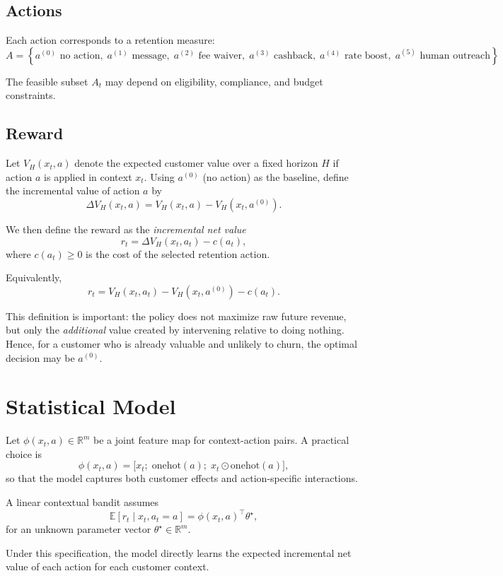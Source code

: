 \documentclass[11pt,a4paper]{article}
\begin{document}
\subsection*{Actions}

Each action corresponds to a retention measure:
\[
A=\left\{
a^{(0)}\text{ no action},\;
a^{(1)}\text{ message},\;
a^{(2)}\text{ fee waiver},\;
a^{(3)}\text{ cashback},\;
a^{(4)}\text{ rate boost},\;
a^{(5)}\text{ human outreach}
\right\}.
\]

The feasible subset \(A_t\) may depend on eligibility, compliance, and budget constraints.

\subsection*{Reward}

Let \(V_H(x_t,a)\) denote the expected customer value over a fixed horizon \(H\) if action \(a\) is applied in context \(x_t\).  
Using \(a^{(0)}\) (no action) as the baseline, define the incremental value of action \(a\) by
\[
\Delta V_H(x_t,a) = V_H(x_t,a) - V_H(x_t,a^{(0)}).
\]

We then define the reward as the \emph{incremental net value}
\[
r_t = \Delta V_H(x_t,a_t) - c(a_t),
\]
where \(c(a_t)\geq 0\) is the cost of the selected retention action.

Equivalently,
\[
r_t = V_H(x_t,a_t) - V_H(x_t,a^{(0)}) - c(a_t).
\]

This definition is important: the policy does not maximize raw future revenue, but only the \emph{additional} value created by intervening relative to doing nothing. Hence, for a customer who is already valuable and unlikely to churn, the optimal decision may be \(a^{(0)}\).

\section{Statistical Model}

Let \(\phi(x_t,a)\in\mathbb{R}^m\) be a joint feature map for context-action pairs. A practical choice is
\[
\phi(x_t,a)=\bigl[x_t;\; \mathrm{onehot}(a);\; x_t \odot \mathrm{onehot}(a)\bigr],
\]
so that the model captures both customer effects and action-specific interactions.

A linear contextual bandit assumes
\[
\mathbb{E}[r_t \mid x_t, a_t=a] = \phi(x_t,a)^\top \theta^\star,
\]
for an unknown parameter vector \(\theta^\star \in \mathbb{R}^m\).

Under this specification, the model directly learns the expected incremental net value of each action for each customer context.
\end{document}
